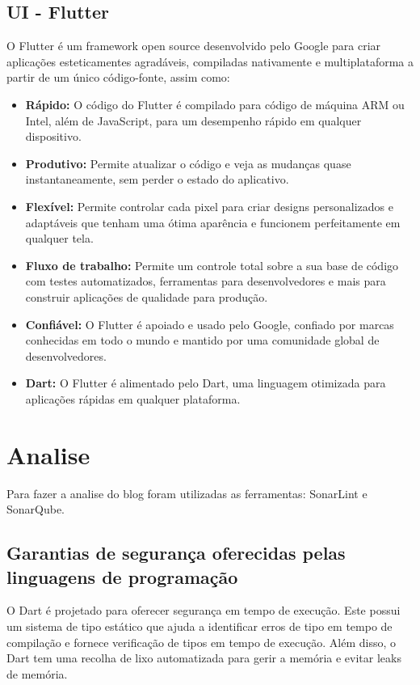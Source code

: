 \documentclass[conference]{IEEEtran}
\begin{document}
\subsection{UI - Flutter}
O Flutter é um framework open source desenvolvido pelo Google para criar aplicações esteticamentes agradáveis, compiladas nativamente e multiplataforma a partir de um único código-fonte, assim como:
\begin{itemize}
    \item \textbf{Rápido:} O código do Flutter é compilado para código de máquina ARM ou Intel, além de JavaScript, para um desempenho rápido em qualquer dispositivo.
    \item \textbf{Produtivo:} Permite atualizar o código e veja as mudanças quase instantaneamente, sem perder o estado do aplicativo.
    \item \textbf{Flexível:} Permite controlar cada pixel para criar designs personalizados e adaptáveis que tenham uma ótima aparência e funcionem perfeitamente em qualquer tela.
    \item \textbf{Fluxo de trabalho:} Permite um controle total sobre a sua base de código com testes automatizados, ferramentas para desenvolvedores e mais para construir aplicações de qualidade para produção.
    \item \textbf{Confiável:} O Flutter é apoiado e usado pelo Google, confiado por marcas conhecidas em todo o mundo e mantido por uma comunidade global de desenvolvedores.
    \item \textbf{Dart:} O Flutter é alimentado pelo Dart, uma linguagem otimizada para aplicações rápidas em qualquer plataforma.
\end{itemize}

\section{Analise}
Para fazer a analise do blog foram utilizadas as ferramentas: SonarLint e SonarQube.

\subsection{Garantias de segurança oferecidas pelas linguagens de programação} 
O Dart é projetado para oferecer segurança em tempo de execução. Este possui um sistema de tipo estático que ajuda a identificar erros de tipo em tempo de compilação e fornece verificação de tipos em tempo de execução. Além disso, o Dart tem uma recolha de lixo automatizada para gerir a memória e evitar leaks de memória.
\end{document}
